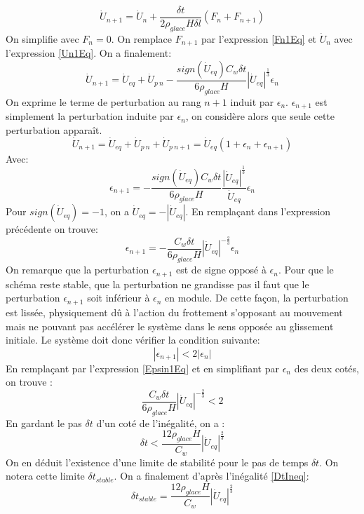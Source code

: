 \documentclass[11pt, a4paper]{article}
\begin{document}
\begin{equation}
\dot{U}_{n+1} = \dot{U}_{n} + \frac{\delta t}{2 \rho_{glace} H \delta l } \left( F_n + F_{n+1} \right) 
\end{equation}
On simplifie avec $F_n = 0$. On remplace $F_{n+1}$ par l'expression \ref{Fn1Eq} et $\dot{U}_n$ avec l'expression \ref{Un1Eq}. On a finalement:
\begin{equation}
\dot{U}_{n+1} = \dot{U}_{eq} + \dot{U}_{p \ n } - \frac{sign(\dot{U}_{eq}) C_w\delta t}{6 \rho_{glace} H} |\dot{U}_{eq}|^{\frac{1}{3}} \epsilon_n 
\end{equation}
On exprime le terme de perturbation au rang $n+1$ induit par $\epsilon_n$. $\epsilon_{n+1}$ est simplement la perturbation induite par $\epsilon_n$, on considère alors que seule cette perturbation apparaît.
\begin{equation}
\dot{U}_{n+1} = \dot{U}_{eq} + \dot{U}_{p \ n} + \dot{U}_{p \ n+1} = \dot{U}_{eq} (1+\epsilon_n +\epsilon_{n+1})
\end{equation}
Avec: 
$$ \epsilon_{n+1} = - \frac{sign(\dot{U}_{eq}) C_w\delta t}{6 \rho_{glace} H} \frac{|\dot{U}_{eq}|^{\frac{1}{3}} }{\dot{U}_{eq}} \epsilon_n $$
Pour $sign(\dot{U}_{eq})=-1$, on a $\dot{U}_{eq} = - |\dot{U}_{eq} |$. En remplaçant dans l'expression précédente on trouve:
\begin{equation}
\epsilon_{n+1} = - \frac{C_w\delta t}{6 \rho_{glace} H} |\dot{U}_{eq}|^{-\frac{2}{3}} \epsilon_n \label{Epsin1Eq}
\end{equation}
On remarque que la perturbation $\epsilon_{n+1}$ est de signe opposé à $\epsilon_{n}$. Pour que le schéma reste stable, que la perturbation ne grandisse pas il faut que le perturbation $\epsilon_{n+1}$ soit inférieur à $\epsilon_n$ en module. De cette façon, la perturbation est lissée, physiquement dû à l'action du frottement s'opposant au mouvement mais ne pouvant pas accélérer le système dans le sens opposée au glissement initiale. Le système doit donc vérifier la condition suivante:
$$ | \epsilon_{n+1} | < 2 | \epsilon_n | $$
En remplaçant par l'expression \ref{Epsin1Eq} et en simplifiant par $\epsilon_n$ des deux cotés, on trouve :
$$ \frac{C_w\delta t}{6 \rho_{glace} H} |\dot{U}_{eq}|^{-\frac{2}{3}} < 2 $$
En gardant le pas $\delta t$ d'un coté de l'inégalité, on a :
\begin{equation}
\delta t < \frac{12 \rho_{glace} H } {C_w} |\dot{U}_{eq} |^{\frac{2}{3}} \label{DtIneq}
\end{equation}
On en déduit l'existence d'une limite de stabilité pour le pas de temps $\delta t$. On notera cette limite $\delta t_{stable}$. On a finalement d'après l'inégalité \ref{DtIneq}:
\begin{equation}
\delta t_{stable} = \frac{12 \rho_{glace} H } {C_w} |\dot{U}_{eq} |^{\frac{2}{3}} \label{DtStableEq}
\end{equation}
\\
 
\end{document}
